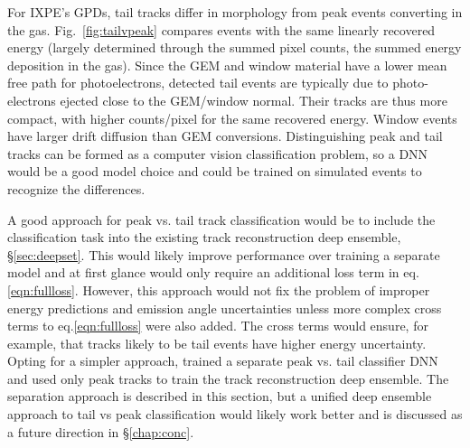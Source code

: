 For IXPE's GPDs, tail tracks differ in morphology from peak events converting in the gas. Fig.~\ref{fig:tailvpeak} compares events with the same linearly recovered energy (largely determined through the summed pixel counts, the summed energy deposition in the gas). Since the GEM and window material have a lower mean free path for photoelectrons, detected tail events are typically due to photo-electrons ejected close to the GEM/window normal. Their tracks are thus more compact, with higher counts/pixel for the same recovered energy. Window events have larger drift diffusion than GEM conversions. Distinguishing peak and tail tracks can be formed as a computer vision classification problem, so a DNN would be a good model choice and could be trained on simulated events to recognize the differences. 

A good approach for peak vs. tail track classification would be to include the classification task into the existing track reconstruction deep ensemble, \S\ref{sec:deepset}. This would likely improve performance over training a separate model and at first glance would only require an additional loss term in eq.\ref{eqn:fullloss}. However, this approach would not fix the problem of improper energy predictions and emission angle uncertainties unless more complex cross terms to eq.\ref{eqn:fullloss} were also added. The cross terms would ensure, for example, that tracks likely to be tail events have higher energy uncertainty. Opting for a simpler approach, \citet{peirson_towards_2021} trained a separate peak vs. tail classifier DNN and used only peak tracks to train the track reconstruction deep ensemble. The \citet{peirson_towards_2021} separation approach is described in this section, but a unified deep ensemble approach to tail vs peak classification would likely work better and is discussed as a future direction in \S\ref{chap:conc}.

